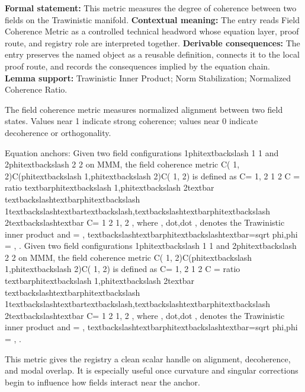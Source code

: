 \begingroup\footnotesize\setlength{\emergencystretch}{3em}\sloppy
\textbf{Formal statement:} This metric measures the degree of coherence between two fields on the Trawinistic manifold. \textbf{Contextual meaning:} The entry reads Field Coherence Metric as a controlled technical headword whose equation layer, proof route, and registry role are interpreted together. \textbf{Derivable consequences:} The entry preserves the named object as a reusable definition, connects it to the local proof route, and records the consequences implied by the equation chain. \textbf{Lemma support:} Trawinistic Inner Product; Norm Stabilization; Normalized Coherence Ratio.\par
\endgroup

The field coherence metric measures normalized alignment between two field states. Values near 1 indicate strong coherence; values near 0 indicate decoherence or orthogonality.

Equation anchors: Given two field configurations   1phitextbackslash 1  1 and   2phitextbackslash 2  2 on MMM, the field coherence metric C(  1,  2)C(phitextbackslash 1,phitextbackslash 2)C(  1,  2) is defined as C=   1,  2    1     2 C = ratio textbarphitextbackslash 1,phitextbackslash 2textbar textbackslashtextbarphitextbackslash 1textbackslashtextbartextbackslash,textbackslashtextbarphitextbackslash 2textbackslashtextbar C=   1    2    1,  2 , where  , dot,dot ,  denotes the Trawinistic inner product and    = , textbackslashtextbarphitextbackslashtextbar=sqrt phi,phi    = , . Given two field configurations   1phitextbackslash 1  1 and   2phitextbackslash 2  2 on MMM, the field coherence metric C(  1,  2)C(phitextbackslash 1,phitextbackslash 2)C(  1,  2) is defined as C=   1,  2    1     2 C = ratio textbarphitextbackslash 1,phitextbackslash 2textbar textbackslashtextbarphitextbackslash 1textbackslashtextbartextbackslash,textbackslashtextbarphitextbackslash 2textbackslashtextbar C=   1    2    1,  2 , where  , dot,dot ,  denotes the Trawinistic inner product and    = , textbackslashtextbarphitextbackslashtextbar=sqrt phi,phi    = , .

This metric gives the registry a clean scalar handle on alignment, decoherence, and modal overlap. It is especially useful once curvature and singular corrections begin to influence how fields interact near the anchor.
\endgroup


